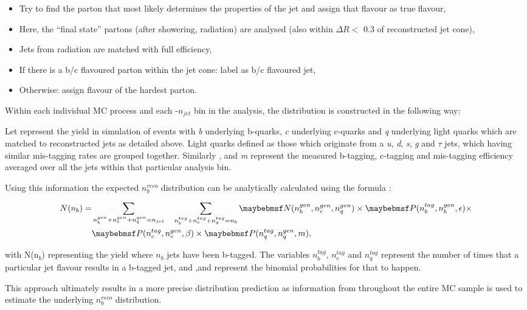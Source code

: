 \begin{itemize}
\item Try to find the parton that most likely determines the properties of the jet and assign that flavour as true flavour,
\item Here, the ``final state'' partons (after showering, radiation) are analysed (also within $\Delta R <$ 0.3 of reconstructed jet cone),
\item Jets from radiation are matched with full efficiency,
\item If there is a b/c flavoured parton within the jet cone: label as b/c flavoured jet,
\item Otherwise: assign flavour of the hardest parton.
\end{itemize}

Within each individual MC process and each \theht-$n_{jet}$ bin in the analysis, the \nbreco distribution is constructed in the following way:

 Let \nbcq represent the yield in simulation of events with \textit{b} underlying b-quarks, \textit{c} underlying c-quarks and \textit{q} underlying light quarks which are matched to reconstructed jets as detailed above. Light quarks defined as those which originate from a \textit{u}, \textit{d}, \textit{s}, \textit{g} and $\tau$ jets, which having similar mis-tagging rates are grouped together.  Similarly \eff, \ceff and \textit{m} represent the measured b-tagging, c-tagging and mis-tagging efficiency averaged over all the jets within that particular analysis bin. 
 
 Using this information the expected $n_{b}^{reco}$ distribution can be analytically calculated using the formula :

\begin{align}
\label{eq:btagformula}
N(n_{b}) =& \sum_{n_{b}^{gen}+n_{c}^{gen}+n_{q}^{gen} = n_{jet}} \quad \sum_{n_{b}^{tag}+n_{c}^{tag}+n_{q}^{tag} = n_{b}} \nbcq \times \probb \times \nonumber \\
& \probc \times \probl,
\end{align}

with N(n$_{b}$) representing the yield where $n_{b}$ jets have been b-tagged.  The variables $n_{b}^{tag}$, $n_{c}^{tag}$ and $n_{q}^{tag}$ represent the number of times that a particular jet flavour results in a b-tagged jet, and \probb,\probc and \probl represent the binomial probabilities for that to happen. 

This approach ultimately results in a more precise \nbreco distribution prediction as information from throughout the entire MC sample is used to estimate the underlying $n_{b}^{reco}$ distribution.

